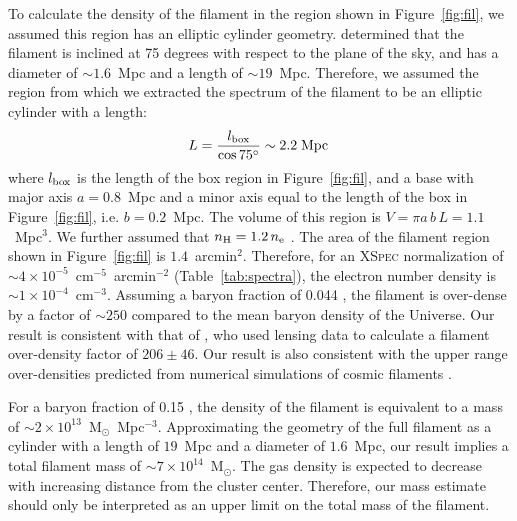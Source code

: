 To calculate the density of the filament in the region shown in Figure~\ref{fig:fil}, we assumed this region has an elliptic cylinder geometry. \citet{Jauzac2012} determined that the filament is inclined at 75 degrees with respect to the plane of the sky, and has a diameter of $\sim 1.6$~Mpc and a length of $\sim 19$~Mpc. Therefore, we assumed the region from which we extracted the spectrum of the filament to be an elliptic cylinder with a length:
\begin{equation}
	L = \frac{l_{\rm box}}{\cos{75^{\circ}}} \sim 2.2 \; {\rm Mpc}\, 
\end{equation}
where $l_{\rm box}$ is the length of the box region in Figure~\ref{fig:fil}, and a base with major axis $a = 0.8$~Mpc and a minor axis equal to the length of the box in Figure~\ref{fig:fil}, i.e. $b = 0.2$~Mpc. The volume of this region is $V = \pi a\, b \, L = 1.1$~Mpc$^3$. We further assumed that $n_{\rm H} = 1.2 \, n_{\rm e}$ \citep{Bohringer2010}. The area of the filament region shown in Figure~\ref{fig:fil} is $1.4$~arcmin$^2$. Therefore, for an \textsc{XSpec} normalization of $\sim 4\times 10^{-5}$~cm$^{-5}$~arcmin${^{-2}}$ (Table~\ref{tab:spectra}), the electron number density is $\sim 1\times 10^{-4}$~cm$^{-3}$. Assuming a baryon fraction of 0.044 \citep{Kirkman2003}, the filament is over-dense by a factor of $\sim 250$ compared to the mean baryon density of the Universe. Our result is consistent with that of \citet{Jauzac2012}, who used lensing data to calculate a filament over-density factor of $206 \pm 46$. Our result is also consistent with the upper range over-densities predicted from numerical simulations of cosmic filaments \citep[e.g.,][]{Gheller2015}.

For a baryon fraction of 0.15 \citep{Mantz2014}, the density of the filament is equivalent to a mass of $\sim 2\times 10^{13}$~M$_{\odot}$~Mpc$^{-3}$.  Approximating the geometry of the full filament as a cylinder with a length of $19$~Mpc and a diameter of $1.6$~Mpc, our result implies a total filament mass of $\sim 7\times 10^{14}$~M$_\odot$. The gas density is expected to decrease with increasing distance from the cluster center. Therefore, our mass estimate should only be interpreted as an upper limit on the total mass of the filament.





